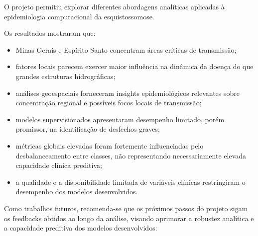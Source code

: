 \documentclass[11pt,a4paper]{article}
\begin{document}
O projeto permitiu explorar diferentes abordagens analíticas aplicadas à epidemiologia computacional da esquistossomose.

Os resultados mostraram que:

\begin{itemize}
    \item Minas Gerais e Espírito Santo concentram áreas críticas de transmissão;
    
    \item fatores locais parecem exercer maior influência na dinâmica da doença do que grandes estruturas hidrográficas;
    
    \item análises geoespaciais forneceram insights epidemiológicos relevantes sobre concentração regional e possíveis focos locais de transmissão;
    
    \item modelos supervisionados apresentaram desempenho limitado, porém promissor, na identificação de desfechos graves;
    
    \item métricas globais elevadas foram fortemente influenciadas pelo desbalanceamento entre classes, não representando necessariamente elevada capacidade clínica preditiva;
    
    \item a qualidade e a disponibilidade limitada de variáveis clínicas restringiram o desempenho dos modelos desenvolvidos.
\end{itemize}

Como trabalhos futuros, recomenda-se que os próximos passos do projeto sigam os feedbacks obtidos ao longo da análise, visando aprimorar a robustez analítica e a capacidade preditiva dos modelos desenvolvidos:
\end{document}
